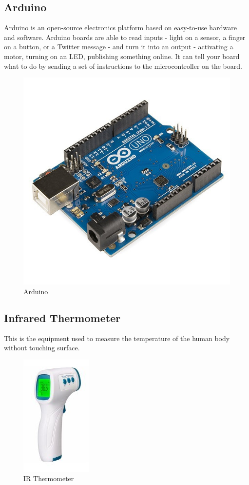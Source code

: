 \documentclass[a4paper,12pt]{report}
\begin{document}
\subsection{Arduino}
Arduino is an open-source electronics platform based on easy-to-use hardware and software.
Arduino boards are able to read inputs - light on a sensor, a finger on a button, or a Twitter
message - and turn it into an output - activating a motor, turning on an LED, publishing
something online. It can tell your board what to do by sending a set of instructions to the
microcontroller on the board.
\begin{figure}[h] %
   \begin{center}
   \includegraphics[scale=0.8]{arduino.jpg}
   \caption{Arduino}
  \end{center}
  \end{figure}
\subsection{Infrared Thermometer}
This is the equipment used to measure the temperature of the human body without touching
surface.
\begin{figure}[h] %
   \begin{center}
   \includegraphics[scale=0.6]{ir thermo.jpg}
   \caption{IR Thermometer}
  \end{center}
  \end{figure}
  \pagebreak
\end{document}

